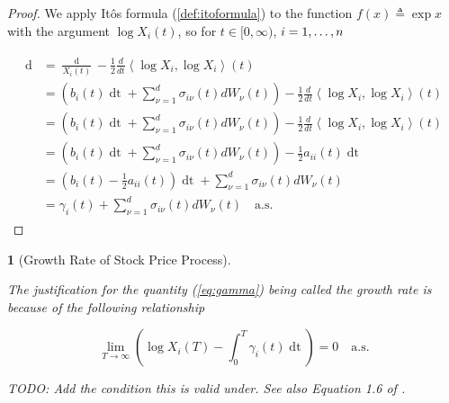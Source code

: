 \documentclass[british]{amsart}
\numberwithin{equation}{section}
\numberwithin{figure}{section}
\theoremstyle{plain}
\newtheorem{thm}{\protect\theoremname}[section]
\theoremstyle{definition}
\theoremstyle{plain}
\theoremstyle{plain}
\theoremstyle{plain}
\theoremstyle{remark}
\theoremstyle{plain}
\providecommand{\theoremname}{Theorem}
\renewcommand{\d}[1]{\mathop{\mathrm{d}{#1}}}
\newcommand{\ranget}{t\in[0,\infty)}
\newcommand{\defeq}{\mathop{\triangleq}}
\newcommand{\almostsurely}{\text{a.s.}}
\begin{document}
\begin{proof}

	We apply It\^{o}s formula (\ref{def:itoformula}) to the function $f(x)\defeq\exp{x}$ with the argument $\log{X_{i}(t)}$, so for $\ranget$, $i=1,\dots,n$

	\begin{gather*}
		\begin{split}
			\d{\log{X_{i}(t)}} 
			 	& = 
					\frac{\d{X_{i}(t)}}{X_{i}(t)} - 
						\frac{1}{2} \frac{d}{dt}\left\langle \log X_{i},\log X_{i}\right\rangle(t)
					\\
				& = 
					\left(
						b_{i}(t)\d{t} + 
						\sum_{\nu=1}^{d} \sigma_{i\nu}(t) dW_{\nu}(t)
					\right)- 
					\frac{1}{2} \frac{d}{dt}\left\langle \log X_{i},\log X_{i}\right\rangle(t)
					\\
				& = 
					\left(
						b_{i}(t)\d{t} + 
						\sum_{\nu=1}^{d} \sigma_{i\nu}(t) dW_{\nu}(t)
					\right)- 
					\frac{1}{2} \frac{d}{dt}\left\langle \log X_{i},\log X_{i}\right\rangle(t)
					\\
				& = 
					\left(
						b_{i}(t)\d{t} + 
						\sum_{\nu=1}^{d} \sigma_{i\nu}(t) dW_{\nu}(t)
					\right)- 
					\frac{1}{2} a_{ii}(t)\d{t}
					\\
				& = 
					\left(
						b_{i}(t) -
						\frac{1}{2} a_{ii}(t)
					\right) \d{t} +
					\sum_{\nu=1}^{d} \sigma_{i\nu}(t) dW_{\nu}(t)
					\\
				& = 
					\gamma_{i}(t) +
					\sum_{\nu=1}^{d} \sigma_{i\nu}(t) dW_{\nu}(t)
				\quad \almostsurely
		\end{split}
	\end{gather*}

\end{proof}

\begin{thm} [Growth Rate of Stock Price Process]
	\label{thm:growthrate}

	The justification for the quantity (\ref{eq:gamma}) being called the 
	\textit{growth rate} is	because of the following relationship

	\begin{equation}
		\lim_{T \to \infty} 
			\left( 
			\log{X_{i}(T)} - \int_{0}^{T} \gamma_{i}(t)\d{t} 
			\right) = 0
		\quad \almostsurely
	\end{equation}

	TODO: Add the condition this is valid under.
	See also Equation 1.6 of \cite{fernholz2009}.

\end{thm}
\end{document}
